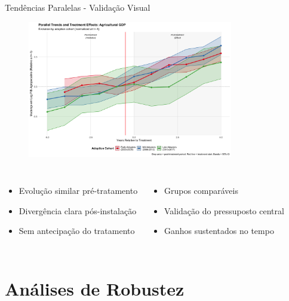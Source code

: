 \documentclass[10pt,aspectratio=169]{beamer}
\begin{document}
\begin{frame}{Tendências Paralelas - Validação Visual}
\begin{figure}
\centering
\includegraphics[width=0.8\textwidth]{../../../data/outputs/parallel_trends_complete_pib_agro_normalized.png}
\end{figure}

\begin{columns}
\begin{itemize}
    \item Evolução similar pré-tratamento
    \item Divergência clara pós-instalação
    \item Sem antecipação do tratamento
\end{itemize}

\begin{itemize}
    \item Grupos comparáveis
    \item Validação do pressuposto central
    \item Ganhos sustentados no tempo
\end{itemize}
\end{columns}
\end{frame}

\section{Análises de Robustez}
\end{document}
